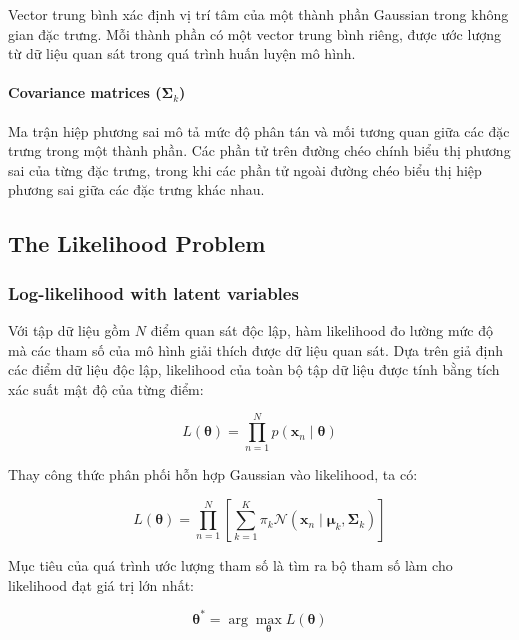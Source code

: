 \documentclass[12pt,a4paper]{article}
\begin{document}
Vector trung bình xác định vị trí tâm của một thành phần
Gaussian trong không gian đặc trưng. Mỗi thành phần có
một vector trung bình riêng, được ước lượng từ dữ liệu
quan sát trong quá trình huấn luyện mô hình.

\paragraph{Covariance matrices ($\boldsymbol{\Sigma}_k$)}

Ma trận hiệp phương sai mô tả mức độ phân tán và mối
tương quan giữa các đặc trưng trong một thành phần.
Các phần tử trên đường chéo chính biểu thị phương sai
của từng đặc trưng, trong khi các phần tử ngoài đường
chéo biểu thị hiệp phương sai giữa các đặc trưng khác nhau.

\subsection{The Likelihood Problem}

\subsubsection*{Log-likelihood with latent variables}

Với tập dữ liệu gồm $N$ điểm quan sát độc lập, hàm
likelihood đo lường mức độ mà các tham số của mô hình
giải thích được dữ liệu quan sát. Dựa trên giả định các
điểm dữ liệu độc lập, likelihood của toàn bộ tập dữ liệu
được tính bằng tích xác suất mật độ của từng điểm:

\begin{equation}
L(\boldsymbol{\theta})
=
\prod_{n=1}^{N}
p(\bm{x}_n\mid\boldsymbol{\theta})
\end{equation}

Thay công thức phân phối hỗn hợp Gaussian vào likelihood,
ta có:

\begin{equation}
L(\boldsymbol{\theta})
=
\prod_{n=1}^{N}
\left[
\sum_{k=1}^{K}
\pi_k
\mathcal{N}(\bm{x}_n\mid
\bm{\mu}_k,\boldsymbol{\Sigma}_k)
\right]
\end{equation}

Mục tiêu của quá trình ước lượng tham số là tìm ra bộ
tham số làm cho likelihood đạt giá trị lớn nhất:

\begin{equation}
\boldsymbol{\theta}^{*}
=
\arg\max_{\boldsymbol{\theta}}
L(\boldsymbol{\theta})
\end{equation}
\end{document}
